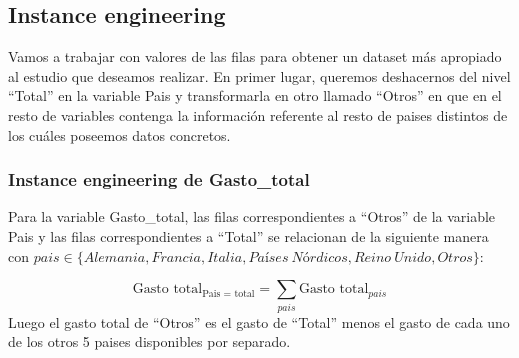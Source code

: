 \documentclass[data,article,submit,moreauthors,pdftex]{Definitions/mdpi}
\newenvironment{Shaded}{\begin{snugshade}}{\end{snugshade}}
\newcommand{\CommentTok}[1]{\textcolor[rgb]{0.56,0.35,0.01}{\textit{#1}}}
\newcommand{\FunctionTok}[1]{\textcolor[rgb]{0.13,0.29,0.53}{\textbf{#1}}}
\newcommand{\NormalTok}[1]{#1}
\newcommand{\OtherTok}[1]{\textcolor[rgb]{0.56,0.35,0.01}{#1}}
\newcommand{\SpecialCharTok}[1]{\textcolor[rgb]{0.81,0.36,0.00}{\textbf{#1}}}
\newcommand{\StringTok}[1]{\textcolor[rgb]{0.31,0.60,0.02}{#1}}
\begin{document}
\subsection{Instance engineering}\label{instance-engineering}

Vamos a trabajar con valores de las filas para obtener un dataset más
apropiado al estudio que deseamos realizar. En primer lugar, queremos
deshacernos del nivel ``Total'' en la variable Pais y transformarla en
otro llamado ``Otros'' en que en el resto de variables contenga la
información referente al resto de paises distintos de los cuáles
poseemos datos concretos.

\begin{Shaded}
\end{Shaded}

\subsubsection{Instance engineering de
Gasto\_total}\label{instance-engineering-de-gasto_total}

Para la variable Gasto\_total, las filas correspondientes a ``Otros'' de
la variable Pais y las filas correspondientes a ``Total'' se relacionan
de la siguiente manera con
\(pais\in\{Alemania, Francia,Italia, Países\ Nórdicos, Reino\ Unido, Otros\}\):

\[ \text{Gasto total}_{\text{Pais = total}} = \sum_{pais}{\text{Gasto total}_{pais}}\]
Luego el gasto total de ``Otros'' es el gasto de ``Total'' menos el
gasto de cada uno de los otros 5 paises disponibles por separado.
\end{document}
